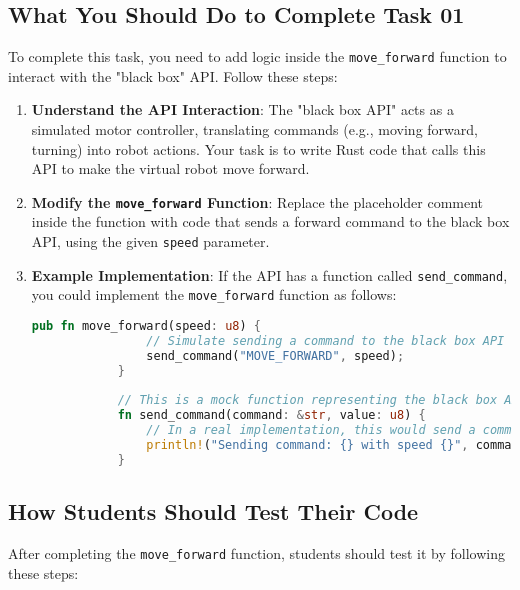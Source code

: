 \documentclass{article}
\begin{document}
	\subsection*{What You Should Do to Complete Task 01}
	
	To complete this task, you need to add logic inside the \texttt{move\_forward} function to interact with the "black box" API. Follow these steps:
	
	\begin{enumerate}
		\item \textbf{Understand the API Interaction}:
		The "black box API" acts as a simulated motor controller, translating commands (e.g., moving forward, turning) into robot actions.
		Your task is to write Rust code that calls this API to make the virtual robot move forward.
		\item \textbf{Modify the \texttt{move\_forward} Function}:
		Replace the placeholder comment inside the function with code that sends a forward command to the black box API, using the given \texttt{speed} parameter.
		\item \textbf{Example Implementation}:
		If the API has a function called \texttt{send\_command}, you could implement the \texttt{move\_forward} function as follows:
		\begin{lstlisting}[language=Rust, caption={Example implementation of move\_forward}]
			pub fn move_forward(speed: u8) {
				// Simulate sending a command to the black box API to move forward
				send_command("MOVE_FORWARD", speed);
			}
			
			// This is a mock function representing the black box API command sender
			fn send_command(command: &str, value: u8) {
				// In a real implementation, this would send a command to the simulated motor
				println!("Sending command: {} with speed {}", command, value);
			}
		\end{lstlisting}
	\end{enumerate}
	
	\subsection*{How Students Should Test Their Code}
	
	After completing the \texttt{move\_forward} function, students should test it by following these steps:
	
\end{document}
